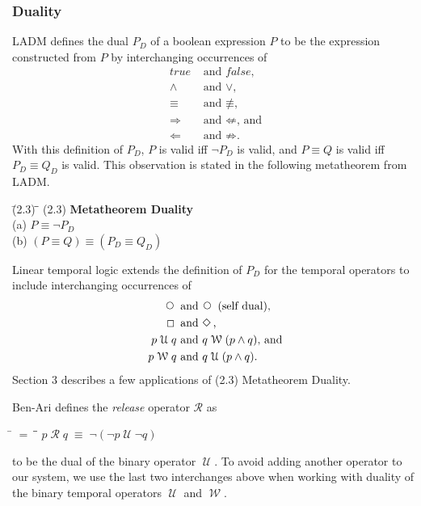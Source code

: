 \documentclass[12pt, fleqn, leqno]{article}
\newcommand{\mymathindent}{24pt}                    %
\newcommand{\equivs}{\ensuremath{\;\equiv\;}}       %
\newcommand{\nequiv}{\ensuremath{\not\equiv}}       %
\newcommand{\impl}{\ensuremath{\Rightarrow}}        %
\newcommand{\nimpl}{\ensuremath{\not\Rightarrow}}   %
\newcommand{\foll}{\ensuremath{\Leftarrow}}         %
\newcommand{\nfoll}{\ensuremath{\not\Leftarrow}}    %
\newcommand{\Until}{\;\mathcal{U}\;}
\newcommand{\Wait}{\;\mathcal{W}\;}
\newcommand{\Next}{\;\,\text{\raisebox{3.5pt}{\circle{6}}}}
\newcommand{\Event}{\Diamond\,}
\newcommand{\Always}{\Box\,}
\newcommand{\myqedtab}{\hspace{384pt}}              %
\begin{document}
\subsubsection*{Duality}\label{section-duality}

LADM \cite{LADM} defines the dual $P_D$ of a boolean expression $P$ to be the expression constructed from $P$ by interchanging occurrences of
\begin{align*}
true       &\textrm{ and } false\textrm{,}\\
\land      &\textrm{ and } \lor\textrm{,}\\
\equiv     &\textrm{ and } \nequiv\textrm{,}\\
\impl      &\textrm{ and } \nfoll\textrm{, and}\\
\foll      &\textrm{ and } \nimpl\textrm{.}
\end{align*}
With this definition of $P_D$, $P$ is valid iff $\neg P_D$ is valid, and $P\equiv Q$ is valid iff $P_D\equiv Q_D$ is valid.
This observation is stated in the following metatheorem from LADM.
\begin{tabbing}
\hspace{\mymathindent} \= (2.3)\; \= \myqedtab \= \kill
  \> (2.3) \> \textbf{Metatheorem Duality}\\
  \>       \> (a) $P \equiv \neg P_D$\\
  \>       \> (b) $(P \equiv Q) \equiv (P_D \equiv Q_D)$
\end{tabbing}

Linear temporal logic extends the definition of $P_D$ for the temporal operators to include interchanging occurrences of
\begin{align*}
\Next      &\textrm{ and } \Next\textrm{ (self dual),}\\
\Always    &\textrm{ and } \Event\textrm{,}\\
p \Until q &\textrm{ and } q \Wait (p \land q)\textrm{, and}\\
p \Wait q  &\textrm{ and } q \Until (p \land q)\textrm{.}
\end{align*}
Section 3 describes a few applications of (2.3) Metatheorem Duality.

Ben-Ari \cite{Ben} defines the \textit{release} operator $\mathcal{R}$ as
\begin{tabbing}
\hspace{\mymathindent} \= $= \;$ \= \myqedtab \= \kill
  \> $p\;\mathcal{R}\; q\equivs \neg(\neg p \Until \neg q)$
\end{tabbing}
to be the dual of the binary operator $\Until$.
To avoid adding another operator to our system, we use the last two interchanges above
when working with duality of the binary temporal operators $\Until$ and $\Wait$.
\end{document}
